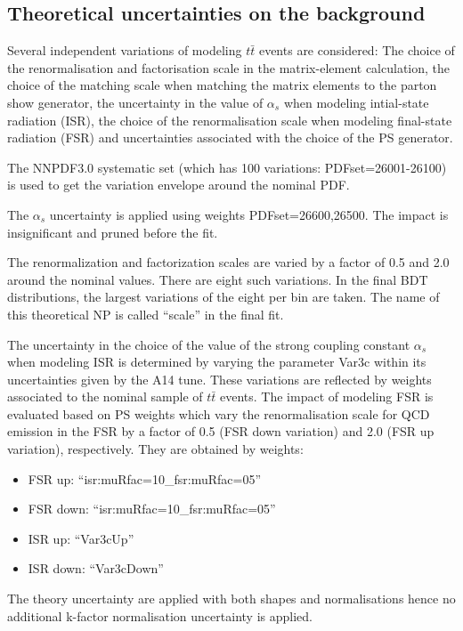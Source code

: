 \subsection{Theoretical uncertainties on the background}

Several independent variations of modeling $t\bar{t}$ events are considered: The choice of the renormalisation and factorisation scale in the matrix-element calculation, the choice of the matching scale when matching the
matrix elements to the parton show generator, the uncertainty in the value of $\alpha_s$ when modeling intial-state radiation (ISR), the choice of the renormalisation scale when modeling final-state radiation (FSR) and
uncertainties associated with the choice of the PS generator.

The NNPDF3.0 systematic set (which has 100 variations: PDFset=26001-26100) is used to get the variation envelope around the nominal PDF.

The $\alpha_s$ uncertainty is applied using weights PDFset=26600,26500. The impact is insignificant and pruned before the fit.

The renormalization and factorization scales are varied by a factor of 0.5 and 2.0 around the nominal values. There are eight such variations. In the final BDT distributions, the largest variations of the eight per bin are taken. The name of this theoretical NP is called ``scale'' in the final fit.

The uncertainty in the choice of the value of the strong coupling constant $\alpha_s$ when modeling ISR is determined by varying the parameter Var3c within its uncertainties given by the A14 tune. These variations are reflected by weights associated to the nominal sample of $t\bar{t}$ events. The impact of modeling FSR is evaluated based on PS weights which vary the renormalisation scale for QCD emission in the FSR by a factor of 0.5 (FSR down variation) and 2.0 (FSR up variation), respectively. They are obtained by weights:
\begin{itemize}
	\item FSR up: ``isr:muRfac=10\_fsr:muRfac=05''
	\item FSR down: ``isr:muRfac=10\_fsr:muRfac=05''
	\item ISR up: ``Var3cUp''
	\item ISR down: ``Var3cDown''
\end{itemize}

The theory uncertainty are applied with both shapes and normalisations hence no additional k-factor normalisation uncertainty is applied.

